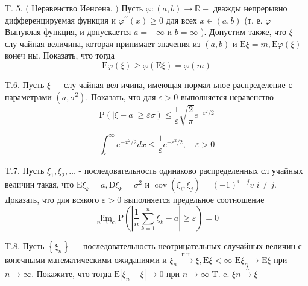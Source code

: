\documentclass[a4paper,12pt]{article} %
\begin{document}
\begin{example}


T. 5. $($ Неравенство Иенсена. $)$ Пусть $\varphi:(a, b) \rightarrow \mathbb{R}-$ дважды непрерывно дифференцируемая функция и $\varphi^{\prime \prime}(x) \geq 0$ для всех $x \in(a, b)$ (т. е. $\varphi$ Выпуклая функция, и допускается $a=-\infty$ и $b=\infty$ ). Допустим также, что $\xi-$ слу чайная величина, которая принимает значения из $(a, b)$ и $\mathrm{E} \xi=m, \mathrm{E} \varphi(\xi)$ конеч ны. Показать, что тогда
$$
\mathrm{E} \varphi(\xi) \geq \varphi(\mathrm{E} \xi)=\varphi(m)
$$



\end{example}



\begin{example}



T.6. Пусть $\xi-$ слу чайная вел ичина, имеющая нормал ьное распределение с параметрами $\left(a, \sigma^{2}\right) .$ Показать, что для $\varepsilon>0$ выполняется неравенство
$$
\mathrm{P}(|\xi-a| \geq \varepsilon \sigma) \leq \frac{1}{\varepsilon} \sqrt{\frac{2}{\pi}} e^{-\varepsilon^{2} / 2}
$$

$$\int_{\varepsilon}^{\infty} e^{-x^{2} / 2} d x \leq \frac{1}{\varepsilon} e^{-\varepsilon^{2} / 2}, \quad \varepsilon>0$$

\end{example}



\begin{example}

T.7. Пусть $\xi_{1}, \xi_{2}, \ldots$ - последовательность одинаково распределенных сл учайных величин такая, что $\mathrm{E} \xi_{k}=a, \mathrm{D} \xi_{k}=\sigma^{2}$ и $\operatorname{cov}\left(\xi_{i}, \xi_{j}\right)=(-1)^{i-j} v$
$i \neq j .$ 
Доказать, что для всякого $\varepsilon>0$ выполняется предельное соотношение
$$
\lim _{n \rightarrow \infty} \mathrm{P}\left(\left|\frac{1}{n} \sum_{k=1}^{n} \xi_{k}-a\right| \geq \varepsilon\right)=0
$$




\end{example}





\begin{example}


T.8. Пусть $\left\{\xi_{n}\right\}-$ последовательность неотрицательных случайных величин с конечными математическими ожиданиями и $\xi_{n} \stackrel{\text { п.н. }}{\rightarrow} \xi, \mathrm{E} \xi<\infty$ $\mathrm{E} \xi_{n} \rightarrow \mathrm{E} \xi$ при $n \rightarrow \infty .$ Покажите, что тогда $\mathrm{E}\left|\xi_{n}-\xi\right| \rightarrow 0$ при $n \rightarrow \infty$
T. e. $\xi n \stackrel{L}{\rightarrow} \xi$



\end{example}
\end{document}
